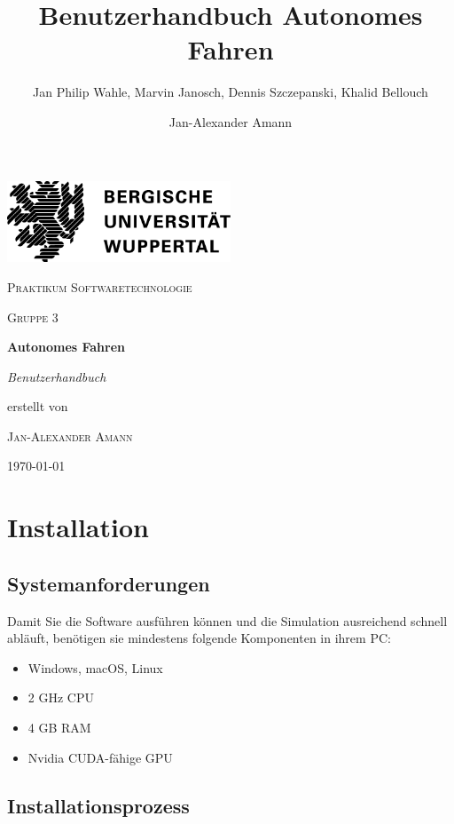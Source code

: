 \documentclass[11pt,a4paper]{article}
\date{}
\author{Jan Philip Wahle, Marvin Janosch, Dennis Szczepanski, Khalid Bellouch
        \and Jan-Alexander Amann}
\title{Benutzerhandbuch Autonomes Fahren}
\begin{document}
\begin{titlepage}
	\centering
	\includegraphics[width=0.5\textwidth]{uni.png}\par\vspace{1cm}
	{\scshape\LARGE Praktikum Softwaretechnologie\par}
	\vspace{1cm}
	{\scshape\Large Gruppe 3\par}
	\vspace{1.5cm}
	{\huge\bfseries Autonomes Fahren\par}
	\vspace{2cm}
	{\Large\itshape Benutzerhandbuch\par}
	\vfill
	erstellt von\par
    \textsc{Jan-Alexander Amann}

	\vfill

	{\large \today\par}
\end{titlepage}

\tableofcontents

\newpage

\section{Installation}

\subsection{Systemanforderungen}
Damit Sie die Software ausführen können und die Simulation ausreichend schnell abläuft, benötigen sie mindestens folgende Komponenten in ihrem PC:
\begin{itemize}
\item Windows, macOS, Linux
\item 2 GHz CPU
\item 4 GB RAM
\item Nvidia CUDA-fähige GPU
\end{itemize}

\subsection{Installationsprozess}
\end{document}
